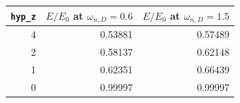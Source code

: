 \begin{tabular}{@{}rrr@{}}
\toprule
\texttt{hyp\_z} & $E/E_0$ at $\omega_{n,D}=0.6$ & $E/E_0$ at $\omega_{n,D}=1.5$\\
\midrule
4 & 0.53881 & 0.57489\\
2 & 0.58137 & 0.62148\\
1 & 0.62351 & 0.66439\\
0 & 0.99997 & 0.99997\\
\bottomrule
\end{tabular}

